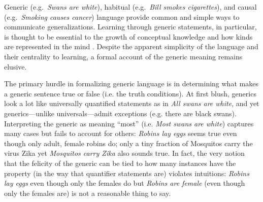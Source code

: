 \documentclass[11pt,letterpaper]{article}
\begin{document}
Generic (e.g.~\emph{Swans are white}), habitual (e.g.~\emph{Bill smokes cigarettes}), and causal (e.g.~\emph{Smoking causes cancer}) language provide common and simple ways to communicate generalizations. 
Learning through generic statements, in particular, is thought to be essential to the growth of conceptual knowledge \cite{Gelman2004} and how kinds are represented in the mind \cite{Leslie2008}.
Despite the apparent simplicity of the language and their centrality to learning, a formal account of the generic meaning remains elusive. 

The primary hurdle in formalizing generic language is in determining what makes a generic sentence true or false (i.e. the truth conditions).
At first blush, generics look a lot like universally quantified statements as in \emph{All swans are white}, and yet generics---unlike universals---admit exceptions (e.g. there are black swans). 
Interpreting the generic as meaning ``most'' (i.e. \emph{Most swans are white}) captures many cases but fails to account for others: \emph{Robins lay eggs} seems true even though only adult, female robins do; only a tiny fraction of Mosquitos carry the virus Zika yet \emph{Mosquitos carry Zika} also sounds true. 
In fact, the very notion that the felicity of the generic can be tied to how many instances have the property (in the way that quantifier statements are) violates intuitions: \emph{Robins lay eggs} even though only the females do but \emph{Robins are female} (even though only the females are) is not a reasonable thing to say.

\end{document}
